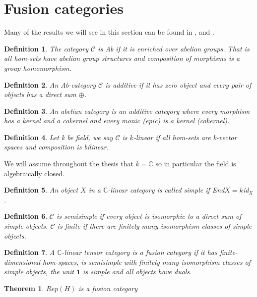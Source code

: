 \documentclass{article}
\newtheorem{definition}{Definition}
\newtheorem{theorem}{Theorem}
\begin{document}



\appendix
	\section{Fusion categories}
	Many of the results we will see in this section can be found in \cite{Mueger08}, \cite{Bartlett15} and \cite{Freyd66}.
	\begin{definition}
		The category $\mathcal{C}$ is Ab if it is enriched over abelian groups. That is all hom-sets have abelian group structures and composition of morphisms is a group homomorphism. 
	\end{definition}
	\begin{definition}
		An Ab-category $\mathcal{C}$ is additive if it has zero object and every pair of objects has a direct sum $\oplus$.
	\end{definition}
	\begin{definition}
		An abelian category is an additive category where every morphism has a kernel and a cokernel and every monic (epic) is a kernel (cokernel).
	\end{definition}
	\begin{definition}
		Let k be field, we say $\mathcal{C}$ is $k$-linear if all hom-sets are k-vector spaces and composition is bilinear.
	\end{definition}
	We will assume throughout the thesis that $k=\mathbb{C}$ so in particular the field is algebraically closed. 
	\begin{definition}
		An object $X$ in a $\mathbb{C}$-linear category is called simple if End$X=k$id$_X$.
	\end{definition}
	\begin{definition}
		$\mathcal{C}$ is semisimple if every object is isomorphic to a direct sum of simple objects. $\mathcal{C}$ is finite if there are finitely many isomorphism classes of simple objects.
	\end{definition}
	\begin{definition}
		A $\mathbb{C}$-linear tensor category is a fusion category if it has finite-dimensional hom-spaces, is semisimple with finitely many isomorphism classes of simple objects, the unit $\mathbf{1}$ is simple  and all objects have duals.
	\end{definition}
	
	\begin{theorem}
		$Rep(H)$ is a fusion category
	\end{theorem}
	
\end{document}
